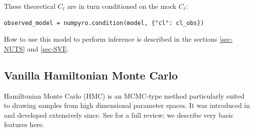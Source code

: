 \documentclass[twocolumn,twocolappendix,nofootinbib,iop]{openjournal}
\newcommand{\nblink}[1]{\href{https://github.com/DifferentiableUniverseInitiative/jax-cosmo-paper/blob/master/notebooks/#1.ipynb}{\faFileCodeO}}
\newcommand{\numpyro}{\texttt{NumPyro}}
\newcommand{\jaxcosmo}{\texttt{jax-cosmo}}
\begin{document}
These theoretical $C_{\ell}$ are in turn conditioned on the mock $C_\ell$:

\begin{lstlisting}[language=iPython]
observed_model = numpyro.condition(model, {"cl": cl_obs})
\end{lstlisting}


%
%
How to use this model to perform inference is described in the sections \ref{sec-NUTS} and \ref{sec-SVI}. %
%
\subsection{Vanilla Hamiltonian Monte Carlo}
%
Hamiltonian Monte Carlo (HMC) is an MCMC-type method particularly suited to drawing
samples from high dimensional parameter spaces.  It was introduced in \citet{1987PhLB..195..216D}
and developed extensively since.  See \citet{betancourt} for a full review; we describe
very basic features here.
\end{document}
